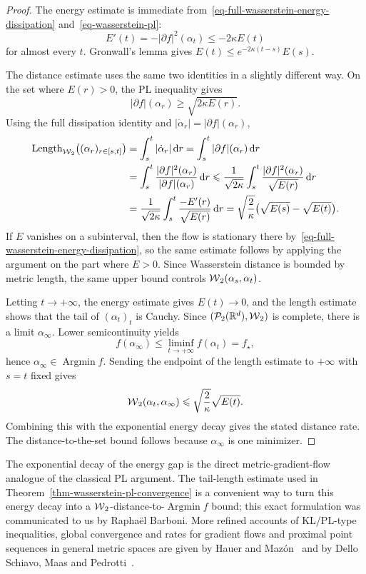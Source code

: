 \begin{proof}
	The energy estimate is immediate from~\eqref{eq-full-wasserstein-energy-dissipation} and~\eqref{eq-wasserstein-pl}:
	\[
		E'(t)
		=
		-|\partial f|^2(\alpha_t)
		\leq
		-2\kappa E(t)
	\]
	for almost every \(t\). Gronwall's lemma gives \(E(t)\leq e^{-2\kappa(t-s)}E(s)\).

	The distance estimate uses the same two identities in a slightly different way. On the set where \(E(r)>0\), the PL inequality gives
	\[
		|\partial f|(\alpha_r)\geq \sqrt{2\kappa E(r)}.
	\]
	Using the full dissipation identity and \(|\dot\alpha_r|=|\partial f|(\alpha_r)\),
	\[
		\begin{aligned}
		\operatorname{Length}_{\operatorname{\mathcal{W}}_2}\bigl((\alpha_r)_{r\in[s,t]}\bigr)
		&=
		\int_s^t|\dot\alpha_r|\,\mathrm{d} r
		=
		\int_s^t|\partial f|(\alpha_r)\,\mathrm{d} r \\
		&=
		\int_s^t
		\frac{|\partial f|^2(\alpha_r)}{|\partial f|(\alpha_r)}\,\mathrm{d} r
		\leqslant
		\frac{1}{\sqrt{2\kappa}}
		\int_s^t
		\frac{|\partial f|^2(\alpha_r)}{\sqrt{E(r)}}\,\mathrm{d} r \\
		&=
		\frac{1}{\sqrt{2\kappa}}
		\int_s^t
		\frac{-E'(r)}{\sqrt{E(r)}}\,\mathrm{d} r
		=
		\sqrt{\frac{2}{\kappa}}\bigl(\sqrt{E(s)}-\sqrt{E(t)}\bigr).
		\end{aligned}
	\]
	If \(E\) vanishes on a subinterval, then the flow is stationary there by~\eqref{eq-full-wasserstein-energy-dissipation}, so the same estimate follows by applying the argument on the part where \(E>0\). Since Wasserstein distance is bounded by metric length, the same upper bound controls \(\operatorname{\mathcal{W}}_2(\alpha_s,\alpha_t)\).

	Letting \(t\to+\infty\), the energy estimate gives \(E(t)\to0\), and the length estimate shows that the tail of \((\alpha_t)_t\) is Cauchy. Since \((\mathcal{P}_2(\mathbb{R}^d),\operatorname{\mathcal{W}}_2)\) is complete, there is a limit \(\alpha_\infty\). Lower semicontinuity yields
	\[
		f(\alpha_\infty)
		\leq
		\liminf_{t\to+\infty}f(\alpha_t)
		=
		f_\star,
	\]
	hence \(\alpha_\infty\in\operatorname{Argmin}f\). Sending the endpoint of the length estimate to \(+\infty\) with \(s=t\) fixed gives
	\[
		\operatorname{\mathcal{W}}_2(\alpha_t,\alpha_\infty)
		\leqslant
		\sqrt{\frac{2}{\kappa}}\sqrt{E(t)}.
	\]
	Combining this with the exponential energy decay gives the stated distance rate. The distance-to-the-set bound follows because \(\alpha_\infty\) is one minimizer.
\end{proof}

The exponential decay of the energy gap is the direct metric-gradient-flow analogue of the classical PL argument. The tail-length estimate used in Theorem~\ref{thm-wasserstein-pl-convergence} is a convenient way to turn this energy decay into a \(\operatorname{\mathcal{W}}_2\)-distance-to-\(\operatorname{Argmin}f\) bound; this exact formulation was communicated to us by Rapha{\"e}l Barboni. More refined accounts of KL/PL-type inequalities, global convergence and rates for gradient flows and proximal point sequences in general metric spaces are given by Hauer and Maz{\'o}n~\citep{HauerMazon2019KLSMetric} and by Dello Schiavo, Maas and Pedrotti~\citep{DelloSchiavoMaasPedrotti2023LocalConditions}.

